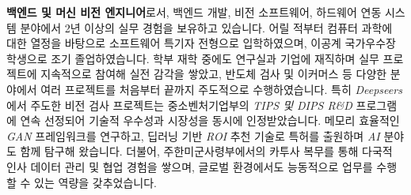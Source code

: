 \documentclass[10pt, a4paper]{cvhari}
\begin{document}
\makecvheader
\medskip

\textbf{백엔드 및 머신 비전 엔지니어}로서, 백엔드 개발, 비전 소프트웨어, 하드웨어 연동 시스템 분야에서 2년 이상의 실무 경험을 보유하고 있습니다. 어릴 적부터 컴퓨터 과학에 대한 열정을 바탕으로 소프트웨어 특기자 전형으로 입학하였으며, 이공계 국가우수장학생으로 조기 졸업하였습니다. 학부 재학 중에도 연구실과 기업에 재직하며 실무 프로젝트에 지속적으로 참여해 실전 감각을 쌓았고, 반도체 검사 및 이커머스 등 다양한 분야에서 여러 프로젝트를 처음부터 끝까지 주도적으로 수행하였습니다. 특히 \textit{Deepseers}에서 주도한 비전 검사 프로젝트는 중소벤처기업부의 \textit{TIPS 및 DIPS R\&D} 프로그램에 연속 선정되어 기술적 우수성과 시장성을 동시에 인정받았습니다. 메모리 효율적인 \textit{GAN} 프레임워크를 연구하고, 딥러닝 기반 \textit{ROI} 추천 기술로 특허를 출원하며 \textit{AI} 분야도 함께 탐구해 왔습니다. 더불어, 주한미군사령부에서의 카투사 복무를 통해 다국적 인사 데이터 관리 및 협업 경험을 쌓으며, 글로벌 환경에서도 능동적으로 업무를 수행할 수 있는 역량을 갖추었습니다.

\smallskip
\end{document}
